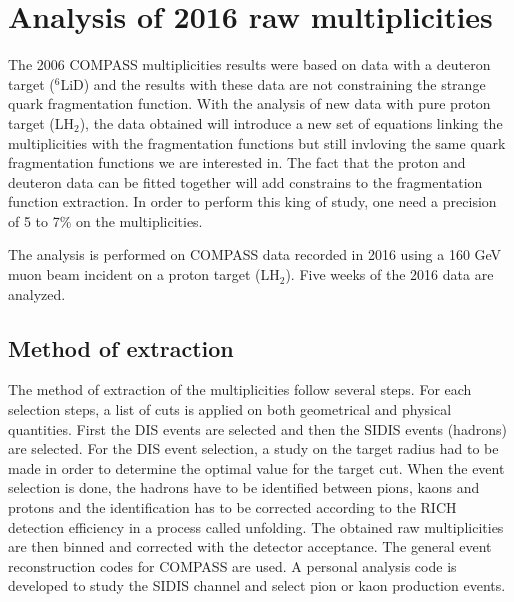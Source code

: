
\chapter{Analysis of 2016 raw multiplicities} %

\label{ch:raw} %

The 2006 COMPASS multiplicities results were based on data with a deuteron target ($^6$LiD)
and the results with these data are not constraining the strange quark fragmentation function.
With the analysis of new data with pure proton target (LH$_2$), the data obtained will introduce
a new set of equations linking the multiplicities with the fragmentation functions but still
invloving the same quark fragmentation functions we are interested in. The fact that the proton
and deuteron data can be fitted together will add constrains to the fragmentation function extraction.
In order to perform this king of study, one need a precision of 5 to 7\% on the multiplicities.

The analysis is performed on COMPASS data recorded in 2016 using a 160 GeV muon beam incident on a proton
target (LH$_2$). Five weeks of the 2016 data are analyzed.


\section{Method of extraction}

The method of extraction of the multiplicities follow several steps. For each selection steps,
a list of cuts is applied on both geometrical and physical quantities. First the DIS events are selected
and then the SIDIS events (hadrons) are selected. For the DIS event selection, a study on the target radius
had to be made in order to determine the optimal value for the target cut. When the event selection is done,
the hadrons have to be identified between pions, kaons and protons and the identification has to be corrected
according to the RICH detection efficiency in a process called unfolding. The obtained raw multiplicities are
then binned and corrected with the detector acceptance. The general event reconstruction codes for COMPASS are
used. A personal analysis code is developed to study the SIDIS channel and select pion or kaon production events.


